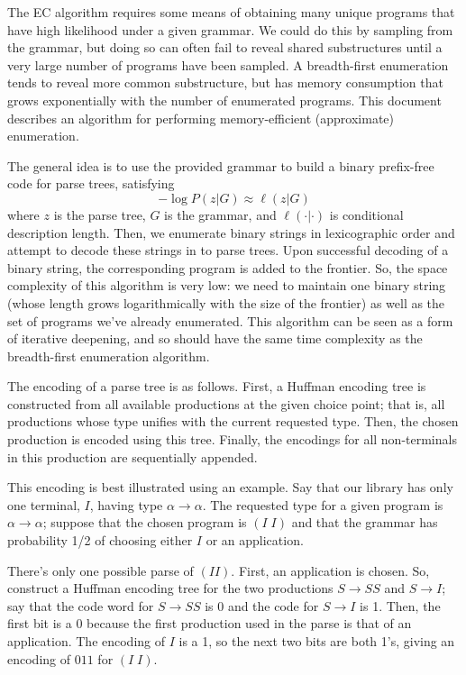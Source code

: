 \documentclass{article}
\begin{document}
The EC algorithm requires some means of obtaining many unique programs that have high likelihood under a given grammar.
We could do this by sampling from the grammar, but doing so can often fail to reveal shared substructures until a very large number of programs have been sampled.
A breadth-first enumeration tends to reveal more common substructure, but has memory consumption that grows exponentially with the number of enumerated programs.
This document describes an algorithm for performing memory-efficient (approximate) enumeration.

The general idea is to use the provided grammar to build a binary prefix-free code for parse trees, satisfying
$$
- \log P(z|G) \approx \ell (z|G)
$$
where $z$ is the parse tree, $G$ is the grammar, and $\ell(\cdot|\cdot)$ is conditional description length.
Then, we enumerate binary strings in lexicographic order and attempt to decode these strings in to parse trees.
Upon successful decoding of a binary string, the corresponding program is added to the frontier.
So, the space complexity of this algorithm is very low: we need to maintain one binary string (whose length grows logarithmically with the size of the frontier) as well as the set of programs we've already enumerated.
This algorithm can be seen as a form of iterative deepening, and so should have the same time complexity as the breadth-first enumeration algorithm.

The encoding of a parse tree is as follows.
First, a Huffman encoding tree is constructed from all available productions at the given choice point; that is, all productions whose type unifies with the current requested type.
Then, the chosen production is encoded using this tree.
Finally, the encodings for all non-terminals in this production are sequentially appended.

This encoding is best illustrated using an example.
Say that our library has only one terminal, $I$, having type $\alpha\to\alpha$.
The requested type for a given program is $\alpha\to\alpha$; suppose that the chosen program is $(I\; I)$ and that the grammar has probability 1/2 of choosing either $I$ or an application.

There's only one possible parse of $(I I)$.
First, an application is chosen.
So, construct a Huffman encoding tree for the two productions $S\to S S$ and $S\to I$; say that the code word for $S\to SS$ is 0 and the code for $S\to I$ is 1.
Then, the first bit is a 0 because the first production used in the parse is that of an application.
The encoding of $I$ is a 1, so the next two bits are both 1's, giving an encoding of $011$ for $(I\; I)$.
\end{document}
